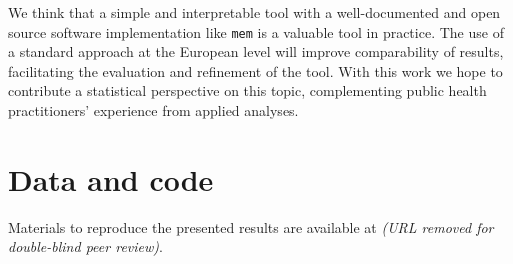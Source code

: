 \documentclass{article}
\begin{document}

We think that a simple and interpretable tool with a well-documented and open source software implementation like \texttt{mem} is a valuable tool in practice. The use of a standard approach at the European level will improve comparability of results, facilitating the evaluation and refinement of the tool. With this work we hope to contribute a statistical perspective on this topic, complementing public health practitioners' experience from applied analyses.


\section*{Data and code}

Materials to reproduce the presented results are available at \textit{(URL removed for double-blind peer review)}. %








\end{document}

